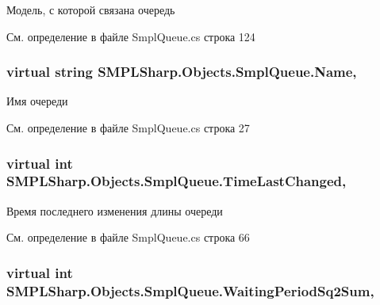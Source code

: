 Модель, с которой связана очередь 



См. определение в файле Smpl\-Queue.\-cs строка 124

\hypertarget{class_s_m_p_l_sharp_1_1_objects_1_1_smpl_queue_af8121cfdf0a8b265c860ae764af1ab33}{
\subsubsection[{Name}]{\setlength{\rightskip}{0pt plus 5cm}virtual string S\-M\-P\-L\-Sharp.\-Objects.\-Smpl\-Queue.\-Name\hspace{0.3cm}{\ttfamily [get]}, {\ttfamily [set]}}}\label{d3/ded/class_s_m_p_l_sharp_1_1_objects_1_1_smpl_queue_af8121cfdf0a8b265c860ae764af1ab33}


Имя очереди 



См. определение в файле Smpl\-Queue.\-cs строка 27

\hypertarget{class_s_m_p_l_sharp_1_1_objects_1_1_smpl_queue_a93a68f8fefe39b5dafa2145e6ec3fa99}{
\subsubsection[{Time\-Last\-Changed}]{\setlength{\rightskip}{0pt plus 5cm}virtual int S\-M\-P\-L\-Sharp.\-Objects.\-Smpl\-Queue.\-Time\-Last\-Changed\hspace{0.3cm}{\ttfamily [get]}, {\ttfamily [set]}}}\label{d3/ded/class_s_m_p_l_sharp_1_1_objects_1_1_smpl_queue_a93a68f8fefe39b5dafa2145e6ec3fa99}


Время последнего изменения длины очереди 



См. определение в файле Smpl\-Queue.\-cs строка 66

\hypertarget{class_s_m_p_l_sharp_1_1_objects_1_1_smpl_queue_aadbd85e6bd504c71fb38c568c771c49b}{
\subsubsection[{Waiting\-Period\-Sq2\-Sum}]{\setlength{\rightskip}{0pt plus 5cm}virtual int S\-M\-P\-L\-Sharp.\-Objects.\-Smpl\-Queue.\-Waiting\-Period\-Sq2\-Sum\hspace{0.3cm}{\ttfamily [get]}, {\ttfamily [set]}}}\label{d3/ded/class_s_m_p_l_sharp_1_1_objects_1_1_smpl_queue_aadbd85e6bd504c71fb38c568c771c49b}


